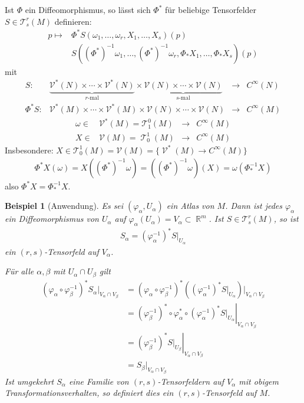 \documentclass[paper=A4, twoside, chapterprefix=true, bibliography=totoc, headsepline]{scrbook}
\let\temp\phi{}
\let\phi\varphi{}
\let\varphi\temp{}
\let\temp\theta{}
\let\theta\vartheta{}
\let\vartheta\temp{}
\let\temp\epsilon{}
\let\epsilon\varepsilon{}
\let\varepsilon\temp{}
\let\temp\rho{}
\let\rho\varrho{}
\let\varrho\temp{}
\DeclareMathOperator{\R}{\mathbb{R}}
\DeclareMathOperator{\calT}{\mathcal{T}}
\DeclareMathOperator{\calV}{\mathcal{V}}
\newcommand{\X}{\times}
\theoremstyle{plain}
\theoremstyle{nonumberplain}
\newtheorem{bsp}{Beispiel}
\theoremstyle{empty}
\theoremstyle{break}
\begin{document}
Ist $\Phi$ ein Diffeomorphismus, so l\"asst sich $\Phi^{*}$ f\"ur beliebige Tensorfelder $S \in \mathcal T_s^r(M)$ definieren:
\begin{align*}
	p \mapsto {}& \Phi^{*}S (\omega_1,\ldots,\omega_r,X_1,\ldots,X_s)(p)\\
	& S((\Phi^{*})^{-1}\omega_1, \ldots, (\Phi^{*})^{-1}\omega_{r}, \Phi_{*}X_1,\ldots,\Phi_{*}X_s)(p)
\end{align*}
mit
	\[ \begin{array}{rccc} S \colon& \underbrace{\mathcal V^{*}(N) \X \cdots \X \mathcal V^{*}(N)}_{r\text{-mal}} \X \underbrace{ \mathcal V(N) \X \cdots \X \mathcal V(N)}_{s\text{-mal}} &\to& C^{\infty}(N)\\
		\Phi^*S \colon& \mathcal V^{*}(M) \X \cdots \X \mathcal V^{*}(M) \X \mathcal V(N) \X \cdots \X \mathcal V(N) &\to& C^{\infty}(M) \end{array} \]
	\[ \begin{array}{rccc} \omega \in & \mathcal V^{*}(M) = \mathcal T_1^0(M) &\to& C^{\infty}(M)\\
		X \in & \mathcal V(M) = \calT_0^1(M) &\to& C^{\infty}(M) \end{array} \]
Insbesondere: $X \in \mathcal T_0^1(M) = \mathcal V(M) = \{\calV^*(M) \to C^{\infty}(M)\}$
\begin{align*}
  \Phi^{*}X(\omega) = X((\Phi^{*})^{-1}\omega) = ((\Phi^{*})^{-1}\omega)(X) = \omega(\Phi_{*}^{-1}X)
\end{align*}
also $\Phi^{*}X = \Phi_{*}^{-1}X$.

\begin{bsp}[Anwendung]
  Es sei $(\phi_{\alpha},U_{\alpha})$ ein Atlas von $M$. Dann ist jedes $\phi_{\alpha}$ ein Diffeomorphismus von $U_{\alpha}$ auf $\phi_{\alpha}(U_{\alpha}) = V_{\alpha} \subset \R^m$. Ist $S \in \mathcal T_s^r(M)$, so ist
  \begin{align*}
    S_{\alpha} = (\phi_{\alpha}^{-1})^{*}S|_{U_\alpha}
  \end{align*}
  ein $(r,s)$-Tensorfeld auf $V_{\alpha}$.


  F\"ur alle $\alpha, \beta$ mit $U_{\alpha} \cap U_{\beta}$ gilt
  \begin{align*}
    (\phi_{\alpha} \circ \phi_{\beta}^{-1})^{*}S_{\alpha}|_{V_{\alpha} \cap V_{\beta}} & = (\phi_{\alpha} \circ \phi_{\beta}^{-1})^{*}\left((\phi_{\alpha}^{-1})^{*}S|_{U_{\alpha}}\right)|_{V_{\alpha}\cap V_{\beta}}\\
    & = \left.(\phi_{\beta}^{-1})^{*} \circ \phi_{\alpha}^{*} \circ (\phi_{\alpha}^{-1})^{*} S|_{U_{\alpha}}\right|_{V_{\alpha} \cap V_{\beta}}\\
    & = \left.(\phi_{\beta}^{-1})^{*}S|_{U_{\beta}}\right|_{V_{\alpha} \cap V_{\beta}}\\
    & = S_{\beta}|_{V_{\alpha} \cap V_{\beta}}
  \end{align*}
  Ist umgekehrt $S_\alpha$ eine Familie von $(r,s)$-Tensorfeldern auf $V_{\alpha}$ mit obigem Transformationsverhalten, so definiert dies ein $(r,s)$-Tensorfeld auf $M$.
\end{bsp}
\end{document}
